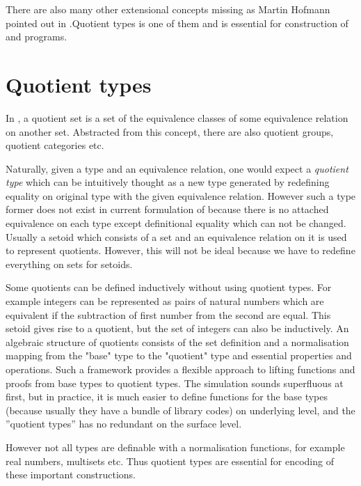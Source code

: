 There are also many other extensional concepts missing as Martin Hofmann pointed out in \cite{hof:phd}.Quotient types is one of them and is essential for construction of \maths and programs.


\section{Quotient types}

In \maths, a quotient set is a set of the equivalence classes of
some equivalence relation on another set. Abstracted from this
concept, there are also quotient groups, quotient categories etc.

Naturally, given a type and an equivalence relation, one would expect a \emph{quotient type}
which can be intuitively thought as a new type generated by redefining equality on original type with the given equivalence relation.
However such a type former does not exist in current formulation of \itt because there is no attached equivalence on each type except definitional equality which can not be changed. Usually a setoid which consists of a set and an equivalence relation on it is used to represent quotients. However, this will not be ideal because we have to redefine everything on sets for setoids.

Some quotients can be defined inductively without using quotient types. 
For example integers can be represented as pairs of natural numbers which are equivalent if the subtraction of first number from the second are equal.  This setoid gives rise to a quotient, but the set of integers can also be inductively. An algebraic structure of quotients consists of the set definition and a normalisation mapping from the "base" type to the "quotient" type and essential properties and operations. Such a framework provides a flexible approach to lifting functions and proofs from base types to quotient types. The simulation sounds superfluous at first, but in practice, it is much easier to define
functions for the base types (because usually they have a bundle of
library codes) on underlying level, and the ''quotient types'' has no
redundant on the surface level.

However not all types are definable with a normalisation functions, for example real numbers, multisets etc. Thus quotient types are essential for encoding of these important constructions.

